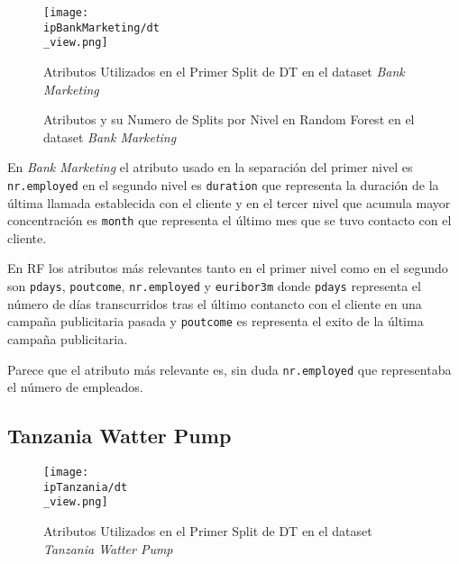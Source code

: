 \documentclass[..]{subfiles}
\begin{document}
\begin{figure}[h!]
	\centering
	\texttt{[image: \\ipBankMarketing/dt\\\_view.png]}
	\caption{Atributos Utilizados en el Primer Split de DT en el dataset \textit{Bank Marketing}}%
\end{figure}

\begin{figure}[h!]
\centering
{}
\caption{Atributos y su Numero de Splits por Nivel en Random Forest en el dataset \textit{Bank Marketing}}%
\end{figure}

En \textit{Bank Marketing} el atributo usado en la separación del primer nivel es \texttt{nr.employed} en el segundo nivel es \texttt{duration} que representa la duración de la última llamada establecida con el cliente y en el tercer nivel que acumula mayor concentración es \texttt{month} que representa el último mes que se tuvo contacto con el cliente.

En RF los atributos más relevantes tanto en el primer nivel como en el segundo son \texttt{pdays}, \texttt{poutcome}, \texttt{nr.employed} y \texttt{euribor3m} donde \texttt{pdays} representa el número de días transcurridos tras el último contancto con el cliente en una campaña publicitaria pasada y \texttt{poutcome} es representa el exito de la última campaña publicitaria.

Parece que el atributo más relevante es, sin duda \texttt{nr.employed} que representaba el número de empleados.


\subsection{Tanzania Watter Pump}

\begin{figure}[h!]
	\centering
	\texttt{[image: \\ipTanzania/dt\\\_view.png]}
	\caption{Atributos Utilizados en el Primer Split de DT en el dataset \textit{Tanzania Watter Pump}}%
\end{figure}
\end{document}
